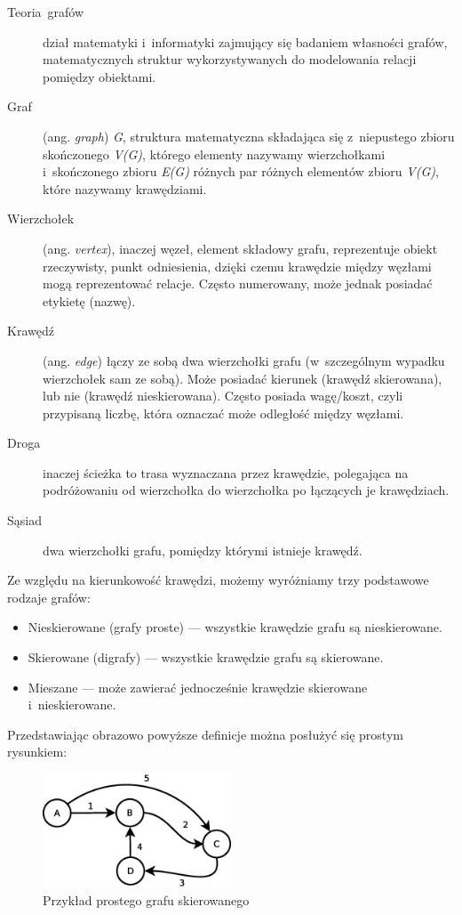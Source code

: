 \documentclass[a4paper,12pt,polish,twoside,openright]{thesis}
\begin{document}
\begin{description}
	\item[Teoria~grafów] dział matematyki i~informatyki zajmujący się badaniem własności grafów, matematycznych struktur wykorzystywanych do modelowania relacji pomiędzy obiektami.

	\item[Graf] (ang. \emph{graph}) \emph{G}, struktura matematyczna składająca się z~niepustego zbioru skończonego \emph{V(G)}, którego elementy nazywamy wierzchołkami i~skończonego zbioru \emph{E(G)} różnych par różnych elementów zbioru \emph{V(G)}, które nazywamy krawędziami.

	\item[Wierzchołek] (ang. \emph{vertex}), inaczej węzeł, element składowy grafu, reprezentuje obiekt rzeczywisty, punkt odniesienia, dzięki czemu krawędzie między węzłami mogą reprezentować relacje. Często numerowany, może jednak posiadać etykietę (nazwę).

	\item[Krawędź] (ang. \emph{edge}) łączy ze sobą dwa wierzchołki grafu (w~szczególnym wypadku wierzchołek sam ze sobą). Może posiadać kierunek (krawędź skierowana), lub nie (krawędź nieskierowana). Często posiada wagę/koszt, czyli przypisaną liczbę, która oznaczać może odległość między węzłami.

	\item[Droga] inaczej ścieżka to trasa wyznaczana przez krawędzie, polegająca na podróżowaniu od wierzchołka do wierzchołka po łączących je krawędziach.

	\item[Sąsiad] dwa wierzchołki grafu, pomiędzy którymi istnieje krawędź.
\end{description}

Ze względu na kierunkowość krawędzi, możemy wyróżniamy trzy podstawowe rodzaje grafów:
\begin{itemize}
	\item Nieskierowane (grafy proste) --- wszystkie krawędzie grafu są nieskierowane.
	\item Skierowane (digrafy) --- wszystkie krawędzie grafu są skierowane.
	\item Mieszane --- może zawierać jednocześnie krawędzie skierowane i~nieskierowane.
\end{itemize}

Przedstawiając obrazowo powyższe definicje można posłużyć się prostym rysunkiem:
\begin{figure}[htb]
	\begin{center}
		\includegraphics[width=0.5\textwidth]{gfx/small_graph.eps}
		\caption{Przykład prostego grafu skierowanego}
		\label{fig:smallgraph}
	\end{center}
\end{figure}
\end{document}
